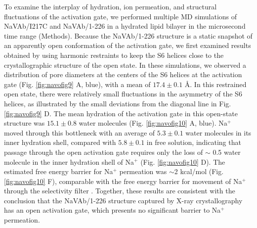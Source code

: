 \begin{refsection}
{To examine the interplay of hydration, ion permeation, and structural fluctuations of the activation gate, we performed multiple MD simulations of NaVAb/I217C and NaVAb/1-226 in a hydrated lipid bilayer in the microsecond time range (Methods). Because the NaVAb/1-226 structure is a static snapshot of an apparently open conformation of the activation gate, we first examined results obtained by using harmonic restraints to keep the S6 helices close to the crystallographic structure of the open state. In these simulations, we observed a distribution of pore diameters at the centers of the S6 helices at the activation gate (Fig. \ref{fig:navofig9} A, blue), with a mean of $17.4 \pm 0.1$ \AA. In this restrained open state, there were relatively small fluctuations in the asymmetry of the S6 helices, as illustrated by the small deviations from the diagonal line in Fig. \ref{fig:navofig9} D. The mean hydration of the activation gate in this open-state structure was $15.1 \pm 0.8 $ water molecules (Fig. \ref{fig:navofig10} A, blue). Na$^+$ moved through this bottleneck with an average of $ 5.3 \pm 0.1$ water molecules in its inner hydration shell, compared with $5.8 \pm 0.1$ in free solution, indicating that passage through the open activation gate requires only the loss of $\sim$ 0.5 water molecule in the inner hydration shell of Na$^+$ (Fig. \ref{fig:navofig10} D). The estimated free energy barrier for Na$^+$ permeation was $\sim$2 kcal/mol (Fig. \ref{fig:navofig10} F), comparable with the free energy barrier for movement of Na$^+$ through the selectivity filter \cite{Chakrabarti:2013kd}. Together, these results are consistent with the conclusion that the NaVAb/1-226 structure captured by X-ray crystallography has an open activation gate, which presents no significant barrier to Na$^+$ permeation.

}
\end{refsection}

